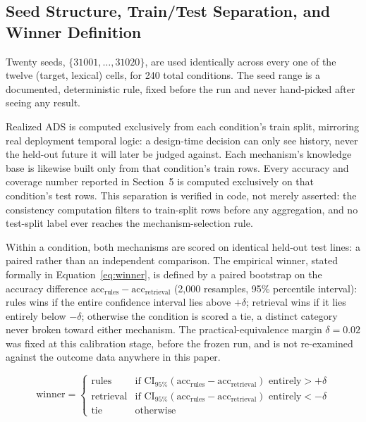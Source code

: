 \documentclass[11pt]{article}
\begin{document}
\subsection{Seed Structure, Train/Test Separation, and Winner Definition}
\label{sec:seeds-splits-winner}

Twenty seeds, $\{31001,\ldots,31020\}$, are used identically across every one
of the twelve (target, lexical) cells, for 240 total conditions. The seed
range is a documented, deterministic rule, fixed before the run and never
hand-picked after seeing any result.

Realized ADS is computed exclusively from each condition's train split,
mirroring real deployment temporal logic: a design-time decision can only see
history, never the held-out future it will later be judged against. Each
mechanism's knowledge base is likewise built only from that condition's train
rows. Every accuracy and coverage number reported in Section~5 is computed
exclusively on that condition's test rows. This separation is verified in
code, not merely asserted: the consistency computation filters to train-split
rows before any aggregation, and no test-split label ever reaches the
mechanism-selection rule.

Within a condition, both mechanisms are scored on identical held-out test
lines: a paired rather than an independent comparison. The empirical winner,
stated formally in Equation~\eqref{eq:winner}, is
defined by a paired bootstrap on the accuracy difference
$\mathrm{acc}_{\mathrm{rules}}-\mathrm{acc}_{\mathrm{retrieval}}$ (2{,}000
resamples, 95\% percentile interval): rules wins if the entire confidence
interval lies above $+\delta$; retrieval wins if it lies entirely below
$-\delta$; otherwise the condition is scored a tie, a distinct category never
broken toward either mechanism. The practical-equivalence margin
$\delta=0.02$ was fixed at this calibration stage, before the frozen run, and
is not re-examined against the outcome data anywhere in this paper.

\begin{equation}
\label{eq:winner}
\mathrm{winner} =
\begin{cases}
\text{rules} & \text{if } \mathrm{CI}_{95\%}(\mathrm{acc}_{\mathrm{rules}} - \mathrm{acc}_{\mathrm{retrieval}}) \text{ entirely} > +\delta \\
\text{retrieval} & \text{if } \mathrm{CI}_{95\%}(\mathrm{acc}_{\mathrm{rules}} - \mathrm{acc}_{\mathrm{retrieval}}) \text{ entirely} < -\delta \\
\text{tie} & \text{otherwise}
\end{cases}
\end{equation}
\end{document}
